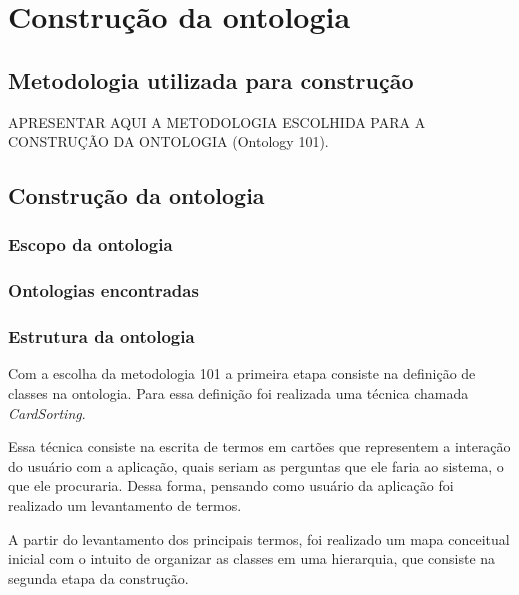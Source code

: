 \chapter{Construção da ontologia}

  \section{Metodologia utilizada para construção}
    
    APRESENTAR AQUI A METODOLOGIA ESCOLHIDA PARA A CONSTRUÇÃO DA ONTOLOGIA (Ontology 101).
    
  \section{Construção da ontologia}
    
    \subsection{Escopo da ontologia}
    
    \subsection{Ontologias encontradas}
   
      
      
    \subsection{Estrutura da ontologia}

	  Com a escolha da metodologia 101 a primeira etapa consiste na definição de classes na ontologia.
	  Para essa definição foi realizada uma técnica chamada \textit{CardSorting}. 
	  
	  Essa técnica consiste na escrita de termos em cartões que representem a interação do usuário com a aplicação,
	  quais seriam as perguntas que ele faria ao sistema, o que ele procuraria. Dessa forma, pensando como usuário
	  da aplicação foi realizado um levantamento de termos.

	  A partir do levantamento dos principais termos, foi realizado um mapa conceitual inicial com o intuito
	  de organizar as classes em uma hierarquia, que consiste na segunda etapa da construção.

% 
